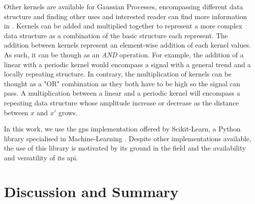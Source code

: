 Other kernels are available for Gaussian Processes, encompassing different data structure and finding other uses and interested reader can find more information in \cite{murphy_machine_2012}. Kernels can be added and multiplied together to represent a more complex data structure as a combination of the basic structure each represent. The addition between kernels represent an element-wise addition of each kernel values. As such, it can be though as an \emph{AND} operation. For example, the addition of a linear with a periodic kernel would encompass a signal with a general trend and a locally repeating structure. In contrary, the multiplication of kernels can be thought as a "OR" combination as they both have to be high so the signal can pass. A multiplication between a linear and a periodic kernel will encompass a repeating data structure whose amplitude increase or decrease as the distance between $x$ and $x'$ grows.

In this work, we use the \gls{gps} implementation offered by Scikit-Learn, a Python library specialised in Machine-Learning \cite{scikit-learn}. Despite other implementations available, the use of this library is motivated by its ground in the field and the availability and versatility of its \gls{api}.

\section{Discussion and Summary}

